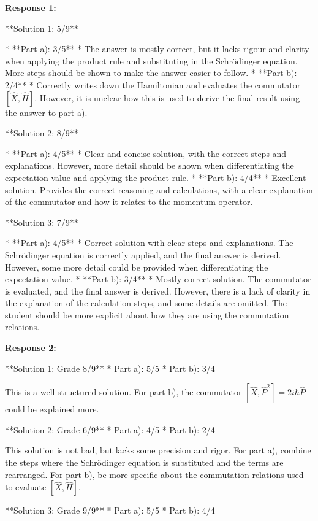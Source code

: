 \documentclass[a4paper,11pt]{article}
\begin{document}
\textbf{Response 1:}

**Solution 1: 5/9**

*   **Part a): 3/5**
    *   The answer is mostly correct, but it lacks rigour and clarity when applying the product rule and substituting in the Schrödinger equation. More steps should be shown to make the answer easier to follow.
*   **Part b): 2/4**
    *   Correctly writes down the Hamiltonian and evaluates the commutator \( \left[ \hat{X}, \hat{H} \right] \). However, it is unclear how this is used to derive the final result using the answer to part a).

**Solution 2: 8/9**

*   **Part a): 4/5**
    *   Clear and concise solution, with the correct steps and explanations. However, more detail should be shown when differentiating the expectation value and applying the product rule.
*   **Part b): 4/4**
    *   Excellent solution. Provides the correct reasoning and calculations, with a clear explanation of the commutator and how it relates to the momentum operator.

**Solution 3: 7/9**

*   **Part a): 4/5**
    *   Correct solution with clear steps and explanations. The Schrödinger equation is correctly applied, and the final answer is derived. However, some more detail could be provided when differentiating the expectation value.
*   **Part b): 3/4**
    *   Mostly correct solution. The commutator is evaluated, and the final answer is derived. However, there is a lack of clarity in the explanation of the calculation steps, and some details are omitted. The student should be more explicit about how they are using the commutation relations.

\bigskip    
\textbf{Response 2:}

**Solution 1: Grade 8/9**
* Part a): 5/5
* Part b): 3/4

This is a well-structured solution. For part b), the commutator  \( \left[ \hat{X}, \hat{P}^2 \right] = 2i\hbar\hat{P} \) could be explained more.

**Solution 2: Grade 6/9**
* Part a): 4/5
* Part b): 2/4

This solution is not bad, but lacks some precision and rigor. For part a), combine the steps where the Schrödinger equation is substituted and the terms are rearranged. For part b), be more specific about the commutation relations used to evaluate \( \left[ \hat{X}, \hat{H}\right] \).

**Solution 3: Grade 9/9**
* Part a): 5/5
* Part b): 4/4
\end{document}
